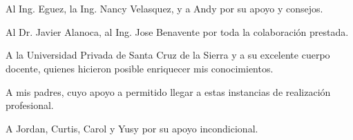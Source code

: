\chapter*{}
\thispagestyle{empty}

\begin{center}
        \vspace{0.3cm}

Al Ing. Eguez, la Ing. Nancy Velasquez, y a Andy por su apoyo y consejos.
        \vspace{0.7cm}

Al Dr. Javier Alanoca, al Ing. Jose Benavente por toda la colaboración prestada.
        \vspace{0.7cm}

A la Universidad Privada de Santa Cruz de la Sierra y a su excelente cuerpo
docente, quienes hicieron posible enriquecer mis conocimientos.
        \vspace{0.7cm}

A mis padres, cuyo apoyo a permitido llegar a estas instancias de realización
profesional.
        \vspace{0.7cm}

A Jordan, Curtis, Carol y Yusy por su apoyo incondicional.

\end{center}

\pagebreak
